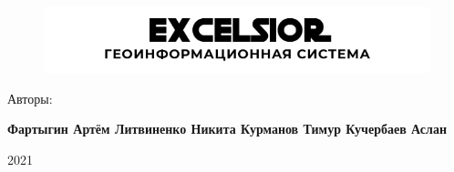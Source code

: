 
\newpage
\thispagestyle{empty}
\begin{figure}[!h]
	\centering
	\includegraphics[width=\linewidth, ]{./img/Hat.png}
\end{figure}
\vspace{13ex}
\begin{center}
	\vspace{13ex}
\end{center}

\vfill
	
\begin{center}
	\noindent
	Авторы:
	
	\textbf{\small Фартыгин Артём \hspace{1.2em}
		Литвиненко Никита \hspace{1.2em}
		Курманов Тимур \hspace{1.2em}
		Кучербаев Аслан}
	
	\vspace{1em}
	
	2021
\end{center}
\newpage
